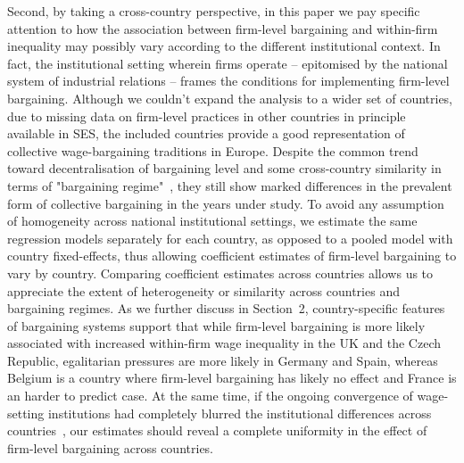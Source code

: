 \documentclass[12pt]{article}
\begin{document}
Second, by taking a cross-country perspective, in this paper we pay specific attention to how the association between firm-level bargaining and within-firm inequality may possibly vary according to the different institutional context. In fact, the institutional setting wherein firms operate -- epitomised by the national system of industrial relations -- frames the conditions for implementing firm-level bargaining. Although we couldn't expand the analysis to a wider set of countries, due to missing data on firm-level practices in other countries in principle available in SES, the included countries provide a good representation of collective wage-bargaining traditions in Europe. Despite the common trend toward decentralisation of bargaining level and some cross-country similarity in terms of "bargaining regime"~\citep{fulton.2013}, they still show marked differences in the prevalent form of collective bargaining in the years under study. To avoid any assumption of homogeneity across national institutional settings, we estimate the same regression models separately for each country, as opposed to a pooled model with country fixed-effects, thus allowing coefficient estimates of firm-level bargaining to vary by country. Comparing coefficient estimates across countries allows us to appreciate the extent of heterogeneity or similarity across countries and bargaining regimes. As we further discuss in Section~2, country-specific features of bargaining systems support that while firm-level bargaining is more likely associated with increased within-firm wage inequality in the UK and the Czech Republic, egalitarian pressures are more likely in Germany and Spain, whereas Belgium is a country where firm-level bargaining has likely no effect and France is an harder to predict case. At the same time, if the ongoing convergence of wage-setting institutions had completely blurred the institutional differences across countries~\citep[see][]{baccaro2017trajectories}, our estimates should reveal a complete uniformity in the effect of firm-level bargaining across countries.
\end{document}
